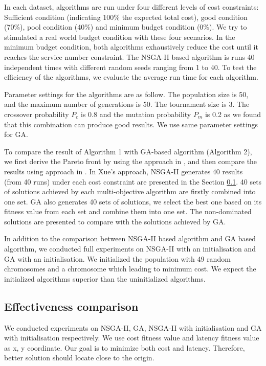 \documentclass{llncs}
\begin{document}
In each dataset, algorithms are run under four different levels of cost constraints: Sufficient condition (indicating 100\% the expected total cost), 
good condition (70\%), pool condition (40\%) and minimum budget condition (0\%). We try to stimulated a real world budget condition with these four 
scenarios. In the minimum budget condition, 
both algorithms exhaustively reduce the cost until it reaches the service number constraint. The NSGA-II based algorithm is runs 40 independent times with different random 
seeds ranging from 1 to 40. To test the efficiency of the algorithms, we evaluate the average run time for each algorithm. 


Parameter settings for the algorithms are as follow. The population size is 50, and the maximum number of 
generations is 50. The tournament size is 3. 
The crossover probability $P_{c}$ is 0.8 and the mutation probability $P_{m}$ 
is 0.2 as we found that this combination can produce good results. We use same parameter settings for GA. 

To compare the result of Algorithm 1 with GA-based algorithm (Algorithm 2), we first derive the Pareto front by using the approach in \cite{Xue} \cite{6381531}, and then compare the results using approach in \cite{1688438}.
In Xue's approach, NSGA-II generates 40 results (from 40 runs) under each cost constraint 
are presented in the Section \ref{sec:comparison}. 40 sets of solutions 
achieved by each multi-objective algorithm are firstly combined into one set. GA also generates 40 sets of 
solutions, we select the best one based on its fitness value from each set and combine them into one set. 
The non-dominated solutions are presented to compare with the solutions achieved by GA.

In addition to the comparison between NSGA-II based algorithm and GA based algorithm, we conducted full experiments on NSGA-II with an initialisation and GA with an initialisation.
We initialized the population with 49 random chromosomes and a chromosome which leading to minimum cost. We expect the initialized algorithms superior than
the uninitialized algorithms.

\subsection{Effectiveness comparison}
\label{sec:comparison}
We conducted experiments on NSGA-II, GA, NSGA-II with initialisation and GA with initialisation respectively. We use cost fitness value and latency fitness value as 
x, y coordinate. Our goal is to minimize both cost and latency. Therefore, better solution should locate close to the origin.
\end{document}
